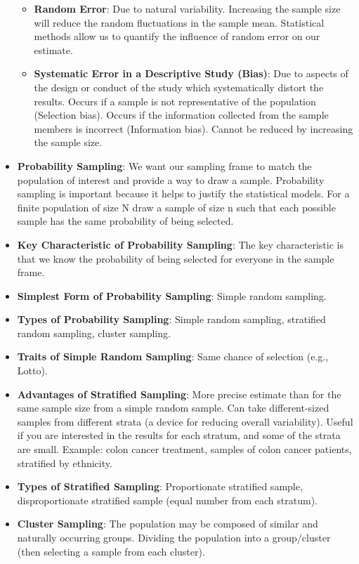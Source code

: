 \documentclass[12pt]{book}
\begin{document}
\begin{itemize}
    \begin{itemize}
    \item \textbf{Random Error}: Due to natural variability. Increasing the sample size will reduce the random fluctuations in the sample mean. Statistical methods allow us to quantify the influence of random error on our estimate.
    \item \textbf{Systematic Error in a Descriptive Study (Bias)}: Due to aspects of the design or conduct of the study which systematically distort the results. Occurs if a sample is not representative of the population (Selection bias). Occurs if the information collected from the sample members is incorrect (Information bias). Cannot be reduced by increasing the sample size.
    \end{itemize}
\item \textbf{Probability Sampling}: We want our sampling frame to match the population of interest and provide a way to draw a sample. Probability sampling is important because it helps to justify the statistical models. For a finite population of size N draw a sample of size n such that each possible sample has the same probability of being selected.
\item \textbf{Key Characteristic of Probability Sampling}: The key characteristic is that we know the probability of being selected for everyone in the sample frame.
\item \textbf{Simplest Form of Probability Sampling}: Simple random sampling.
\item \textbf{Types of Probability Sampling}: Simple random sampling, stratified random sampling, cluster sampling.
\item \textbf{Traits of Simple Random Sampling}: Same chance of selection (e.g., Lotto).
\item \textbf{Advantages of Stratified Sampling}: More precise estimate than for the same sample size from a simple random sample. Can take different-sized samples from different strata (a device for reducing overall variability). Useful if you are interested in the results for each stratum, and some of the strata are small. Example: colon cancer treatment, samples of colon cancer patients, stratified by ethnicity.
\item \textbf{Types of Stratified Sampling}: Proportionate stratified sample, disproportionate stratified sample (equal number from each stratum).
\item \textbf{Cluster Sampling}: The population may be composed of similar and naturally occurring groups. Dividing the population into a group/cluster (then selecting a sample from each cluster).

\end{itemize}
\end{document}
